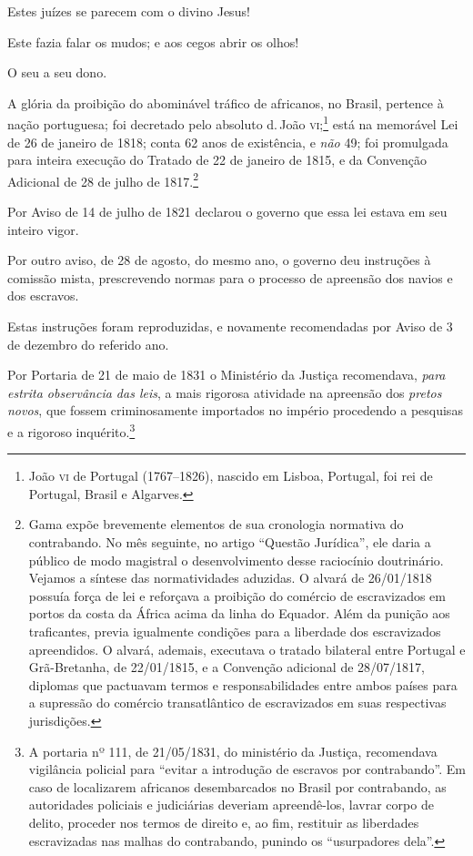 Estes juízes se parecem com o divino Jesus!

Este fazia falar os mudos; e aos cegos abrir os olhos!

\asterisc

O seu a seu dono.

A glória da proibição do abominável tráfico de africanos, no Brasil,
pertence à nação portuguesa; foi decretado pelo absoluto d.\,João
\textsc{vi};\footnote{João \textsc{vi} de Portugal (1767--1826), nascido em Lisboa,
  Portugal, foi rei de Portugal, Brasil e Algarves.} está na memorável
Lei de 26 de janeiro de 1818; conta 62 anos de existência, e \emph{não}
49; foi promulgada para inteira execução do Tratado de 22 de janeiro de
1815, e da Convenção Adicional de 28 de julho de 1817.\footnote{Gama
  expõe brevemente elementos de sua cronologia normativa do contrabando.
  No mês seguinte, no artigo ``Questão Jurídica'', ele daria a
  público de modo magistral o desenvolvimento desse raciocínio
  doutrinário. Vejamos a síntese das normatividades aduzidas. O alvará
  de 26/01/1818 possuía força de lei e reforçava a proibição do comércio
  de escravizados em portos da costa da África acima da linha do
  Equador. Além da punição aos traficantes, previa igualmente condições
  para a liberdade dos escravizados apreendidos. O alvará, ademais,
  executava o tratado bilateral entre Portugal e Grã-Bretanha, de
  22/01/1815, e a Convenção adicional de 28/07/1817, diplomas que
  pactuavam termos e responsabilidades entre ambos países para a
  supressão do comércio transatlântico de escravizados em suas
  respectivas jurisdições.}

Por Aviso de 14 de julho de 1821 declarou o governo que essa lei estava
em seu inteiro vigor.

Por outro aviso, de 28 de agosto, do mesmo ano, o governo deu instruções
à comissão mista, prescrevendo normas para o processo de apreensão dos
navios e dos escravos.

Estas instruções foram reproduzidas, e novamente recomendadas por Aviso
de 3 de dezembro do referido ano.

Por Portaria de 21 de maio de 1831 o Ministério da Justiça recomendava,
\emph{para estrita observância das leis}, a mais rigorosa atividade na
apreensão dos \emph{pretos novos}, que fossem criminosamente importados
no império procedendo a pesquisas e a rigoroso inquérito.\footnote{A
  portaria nº 111, de 21/05/1831, do ministério da Justiça, recomendava
  vigilância policial para ``evitar a introdução de escravos por
  contrabando''. Em caso de localizarem africanos desembarcados no Brasil
  por contrabando, as autoridades policiais e judiciárias deveriam
  apreendê-los, lavrar corpo de delito, proceder nos termos de
  direito e, ao fim, restituir as liberdades escravizadas nas malhas
  do contrabando, punindo os ``usurpadores dela''.}

